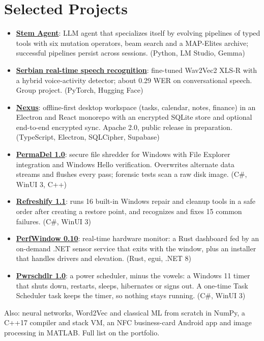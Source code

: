 \documentclass[10pt,a4paper]{article}
\newcommand{\project}[4]{\item \href{#2}{\textbf{#1}}: #3 {\color{muted}\small(#4)}}
\begin{document}
\section{Selected Projects}
\begin{itemize}[itemsep=2pt]
  \project{Stem Agent}{https://github.com/lukastojiljkovic/stem-agent}{LLM agent that specializes itself by evolving pipelines of typed tools with six mutation operators, beam search and a MAP-Elites archive; successful pipelines persist across sessions.}{Python, LM Studio, Gemma}
  \project{Serbian real-time speech recognition}{https://github.com/lukastojiljkovic/serbian-realtime-speech-recognition}{fine-tuned Wav2Vec2 XLS-R with a hybrid voice-activity detector; about 0.29 WER on conversational speech. Group project.}{PyTorch, Hugging Face}
  \project{Nexus}{https://lukastojiljkovic.github.io/CV/\#work}{offline-first desktop workspace (tasks, calendar, notes, finance) in an Electron and React monorepo with an encrypted SQLite store and optional end-to-end encrypted sync. Apache 2.0, public release in preparation.}{TypeScript, Electron, SQLCipher, Supabase}
  \project{PermaDel 1.0}{https://github.com/lukastojiljkovic/PermaDel}{secure file shredder for Windows with File Explorer integration and Windows Hello verification. Overwrites alternate data streams and flushes every pass; forensic tests scan a raw disk image.}{C\#, WinUI 3, C++}
  \project{Refreshify 1.1}{https://github.com/lukastojiljkovic/Refreshify}{runs 16 built-in Windows repair and cleanup tools in a safe order after creating a restore point, and recognizes and fixes 15 common failures.}{C\#, WinUI 3}
  \project{PerfWindow 0.10}{https://github.com/lukastojiljkovic/PerfWindow}{real-time hardware monitor: a Rust dashboard fed by an on-demand .NET sensor service that exits with the window, plus an installer that handles drivers and elevation.}{Rust, egui, .NET 8}
  \project{Pwrschdlr 1.0}{https://github.com/lukastojiljkovic/Power-Scheduler}{a power scheduler, minus the vowels: a Windows 11 timer that shuts down, restarts, sleeps, hibernates or signs out. A one-time Task Scheduler task keeps the timer, so nothing stays running.}{C\#, WinUI 3}
\end{itemize}
\vspace{2pt}
{\small\color{muted}Also: neural networks, Word2Vec and classical ML from scratch in NumPy, a C++17 compiler and stack VM, an NFC business-card Android app and image processing in MATLAB. Full list on the portfolio.}
\end{document}
